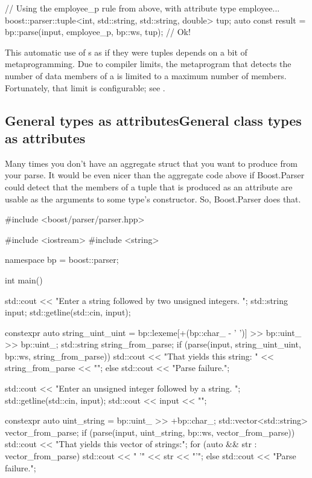 \documentclass{MyBook}
\begin{document}
\begin{code}
// Using the employee_p rule from above, with attribute type employee...
boost::parser::tuple<int, std::string, std::string, double> tup;
auto const result = bp::parse(input, employee_p, bp::ws, tup); // Ok!
\end{code}

\begin{marker}[title=Important ]
This automatic use of s as if they were tuples depends on a bit of metaprogramming. Due to compiler limits, the metaprogram that detects the number of data members of a  is limited to a maximum number of members. Fortunately, that limit is configurable; see . 
\end{marker}

\subsection{{General  types as attributes}{General class types as attributes}}

Many times you don't have an aggregate struct that you want to produce from your parse. It would be even nicer than the aggregate code above if Boost.Parser could detect that the members of a tuple that is produced as an attribute are usable as the arguments to some type's constructor. So, Boost.Parser does that.

\begin{code}
#include <boost/parser/parser.hpp>

#include <iostream>
#include <string>


namespace bp = boost::parser;

int main()
{
    std::cout << "Enter a string followed by two unsigned integers. ";
    std::string input;
    std::getline(std::cin, input);

    constexpr auto string_uint_uint =
        bp::lexeme[+(bp::char_ - ' ')] >> bp::uint_ >> bp::uint_;
    std::string string_from_parse;
    if (parse(input, string_uint_uint, bp::ws, string_from_parse))
        std::cout << "That yields this string: " << string_from_parse << "\n";
    else
        std::cout << "Parse failure.\n";

    std::cout << "Enter an unsigned integer followed by a string. ";
    std::getline(std::cin, input);
    std::cout << input << "\n";

    constexpr auto uint_string = bp::uint_ >> +bp::char_;
    std::vector<std::string> vector_from_parse;
    if (parse(input, uint_string, bp::ws, vector_from_parse)) {
        std::cout << "That yields this vector of strings:\n";
        for (auto && str : vector_from_parse) {
            std::cout << "  '" << str << "'\n";
        }
    } else {
        std::cout << "Parse failure.\n";
    }
}
\end{code}
\end{document}
